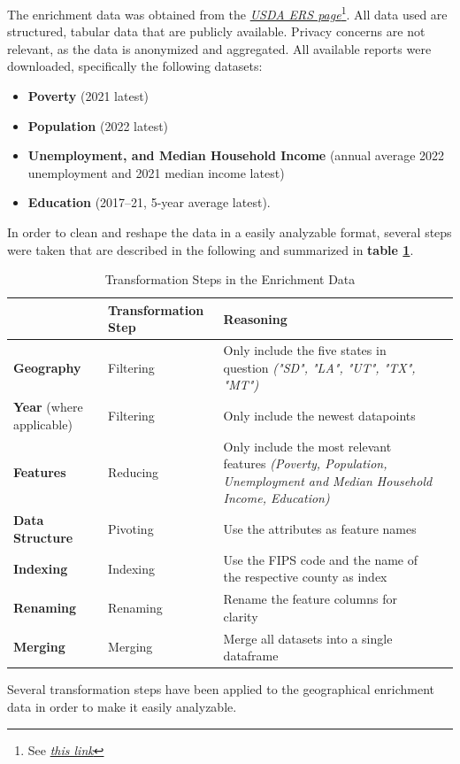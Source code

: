 The enrichment data was obtained from the \textit{\href{https://www.ers.usda.gov/data-products/county-level-data-sets/}{USDA ERS page}}\footnote{See \textit{\href{https://www.ers.usda.gov/data-products/county-level-data-sets/}{this link}}}. All data used are structured, tabular data that are publicly available. Privacy concerns are not relevant, as the data is anonymized and aggregated. All available reports were downloaded, specifically the following datasets:

\begin{itemize}
    \item \textbf{Poverty} (2021 latest)
    \item \textbf{Population} (2022 latest)
    \item \textbf{Unemployment, and Median Household Income} (annual average 2022 unemployment and 2021 median income latest)
    \item \textbf{Education} (2017–21, 5-year average latest).
\end{itemize}

In order to clean and reshape the data in a easily analyzable format, several steps were taken that are described in the following and summarized in \textbf{table \ref{tab:enrichment_transformation_summary}}. %

\begin{table}[h]
    \centering
    \begin{tabularx}{\textwidth}{l *{3}{>{\centering\arraybackslash}X}}
    \hline
     & \textbf{Transformation Step} & \textbf{Reasoning} \\
    \hline
    \textbf{Geography} & Filtering & Only include the five states in question \textit{("SD", "LA", "UT", "TX", "MT")} \\
    \textbf{Year} (where applicable) & Filtering & Only include the newest datapoints \\
    \textbf{Features} & Reducing & Only include the most relevant features \textit{(Poverty, Population, Unemployment and Median Household Income, Education)} \\
    \textbf{Data Structure} & Pivoting & Use the attributes as feature names \\
    \textbf{Indexing} & Indexing & Use the FIPS code and the name of the respective county as index \\
    \textbf{Renaming} & Renaming & Rename the feature columns for clarity \\
    \textbf{Merging} & Merging & Merge all datasets into a single dataframe \\
    \hline
    \end{tabularx}
    \caption{Transformation Steps in the Enrichment Data}
    \small
    Several transformation steps have been applied to the geographical enrichment data in order to make it easily analyzable.
    \label{tab:enrichment_transformation_summary}
\end{table}


